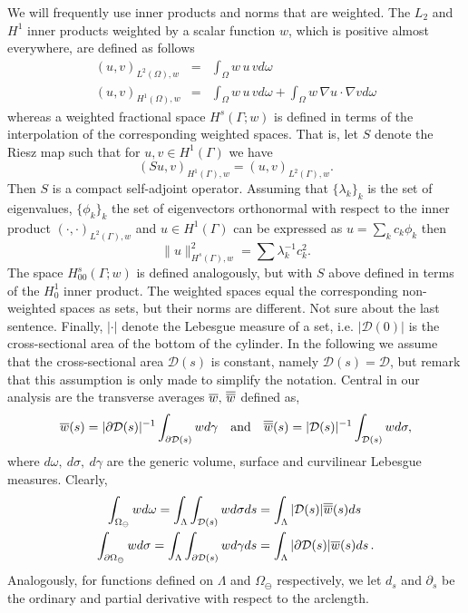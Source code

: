 \documentclass[r]{siamart171218}
\newcommand{\kent}[1]{{\color{blue}#1}}
\newcommand{\miro}[1]{{\color{cyan}#1}}
\begin{document}
\kent{
We will frequently use inner products and norms that are weighted. The
$L_2$ and $H^1$ inner products
weighted by a scalar function 
$w$, which is positive almost everywhere,
are defined as 
follows
\begin{eqnarray*}
(u,v)_{L^2(\Omega), w} &=& 
\int_{\Omega} w \, u \, v d\omega \\
(u,v)_{H^1(\Omega), w} &=& 
\int_{\Omega}  w \, u \, v d\omega
+ \int_{\Omega} w \, \nabla u \cdot \nabla v d\omega
\end{eqnarray*}
whereas a weighted fractional
space \miro{$H^s(\Gamma; w)$} is defined in terms of the interpolation of the corresponding weighted spaces. 
That is, let $S$ denote the
Riesz map such that 
for $u, v \in H^1(\Gamma)$ we have 
\[
(S u,v)_{H^1(\Gamma),w} = (u,v)_{L^2(\Gamma), w}.
\]
Then $S$ is a compact self-adjoint operator. 
Assuming that $\{\lambda_k\}_k$ is the set of eigenvalues, 
$\{\phi_k\}_k$ the set of eigenvectors orthonormal with respect to the inner 
product $(\cdot, \cdot)_{L^2(\Gamma), w}$ and $u\in H^1(\Gamma)$ can be expressed 
as $u=\sum_k c_k \phi_k$ 
then
\[
\|u\|^2_{H^s(\Gamma), w} = \sum \lambda_k^{-1} c_k^2 .   
\]
The space $H_{00}^s(\Gamma; w)$ is defined analogously, but with $S$ above defined in terms of the $H^1_0$ inner product. 
The weighted spaces equal the corresponding non-weighted spaces as sets, but their norms are different. \miro{Not sure about the last sentence.}
 }
 Finally, $|\cdot|$ denote the Lebesgue measure of a set, i.e. $|\mathcal{D}(0)|$ is the cross-sectional area of the bottom of the cylinder. In the following we assume that the cross-sectional area $\mathcal{D}(s)$ is constant, namely $\mathcal{D}(s)=\mathcal{D}$, but remark that this assumption is only made to simplify the notation. Central in our analysis are the transverse averages $\overline{w},\,\overline{\overline{w}}$ defined as, 
\begin{gather*}
\overline{w}(s) = |\partial\mathcal{D}(s)|^{-1} \int_{\partial\mathcal{D}(s)} w d\gamma \quad \mbox{and} \quad 
\overline{\overline{w}}(s) = |\mathcal{D}(s)|^{-1} \int_{\mathcal{D}(s)} w d\sigma, 
\end{gather*}
where $d\omega, \ d\sigma, \ d\gamma$ are the generic volume, surface and curvilinear Lebesgue measures.
Clearly, 
\begin{gather*}
\int_{\Omega_{\ominus}} w d\omega 
= \int_\Lambda \int_{\mathcal{D}(s)} w d\sigma ds
= \int_\Lambda |\mathcal{D}(s)|\overline{\overline{w}}(s) ds\, 
\\
\int_{\partial\Omega_{\ominus}} w d\sigma 
= \int_\Lambda \int_{\partial\mathcal{D}(s)} w d\gamma ds
= \int_\Lambda  |\partial \mathcal{D}(s)| \overline{w}(s) ds\,. 
\end{gather*}
Analogously, for functions defined on $\Lambda$ and $\Omega_\ominus$ respectively, 
we let  $d_s$ and $\partial_s$ be the ordinary and partial derivative with respect to the arclength.
\end{document}
